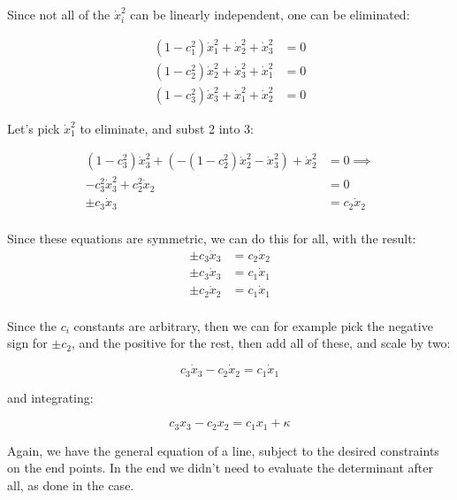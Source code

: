 \documentclass{article}      %
\newcommand{\xdot}[0]{\dot{x}}
\begin{document}
Since not all of the $\xdot_i^2$ can be linearly independent, one can be eliminated:

\begin{align*}
(1 - c_1^2) \xdot_1^2 + \xdot_2^2 + \xdot_3^2 &= 0 \\
(1 - c_2^2) \xdot_2^2 + \xdot_3^2 + \xdot_1^2 &= 0 \\
(1 - c_3^2) \xdot_3^2 + \xdot_1^2 + \xdot_2^2 &= 0
\end{align*}

Let's pick $\xdot_1^2$ to eliminate, and subst 2 into 3:

\begin{align*}
(1 - c_3^2) \xdot_3^2 + (-(1 - c_2^2) \xdot_2^2 - \xdot_3^2) + \xdot_2^2 &= 0
\implies \\
- c_3^2 \xdot_3^2 + c_2^2 \xdot_2 &= 0 \\
\pm c_3 \xdot_3 &= c_2 \xdot_2 \\
\end{align*}

%

Since these equations are symmetric, we can do this for all, with the result:
\begin{align*}
\pm c_3 \xdot_3 &= c_2 \xdot_2 \\
\pm c_3 \xdot_3 &= c_1 \xdot_1 \\
\pm c_2 \xdot_2 &= c_1 \xdot_1 \\
\end{align*}

Since the $c_i$ constants are arbitrary, then we can for example pick the negative sign for $\pm c_2$, and the positive for the rest, then add all of these, and scale by two:

\begin{equation*}
c_3 \xdot_3 - c_2 \xdot_2 = c_1 \xdot_1
\end{equation*}

and integrating:

\begin{equation*}
c_3 x_3 - c_2 x_2 = c_1 x_1 + \kappa
\end{equation*}

Again, we have the general equation of a line, subject to the desired constraints on the end points.  In the end we didn't need to 
evaluate the determinant after all, as done in the 
 case.
\end{document}

